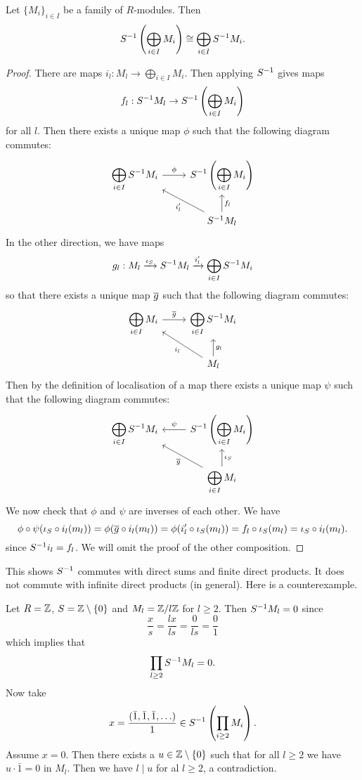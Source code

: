 \begin{prop}[2.8]
  Let $\{M_i\}_{i \in I}$ be a family of $R$-modules.
  Then
  \[S^{-1}\left( \bigoplus_{i \in I} M_i \right) \cong \bigoplus_{i \in I} S^{-1} M_i.\]
\end{prop}

\begin{proof}
  There are maps $i_l: M_l \to \bigoplus_{i \in I} M_i$.
  Then applying $S^{-1}$ gives maps
  \[f_l: S^{-1} M_l \to S^{-1} \left( \bigoplus_{i \in I} M_i \right)\]
  for all $l$.
  Then there exists a unique map $\phi$ such that the following diagram commutes:
  \[\begin{tikzcd}
    \ds \bigoplus_{i \in I} S\inv M_i \arrow[r, "\phi"] & \ds S\inv \left( \bigoplus_{i \in I} M_i \right) \\
     & S\inv M_l \arrow[lu, "i_l'"] \arrow[u, "f_l"']
  \end{tikzcd}\]
  In the other direction, we have maps
  \[g_l: M_l \xrightarrow{\iota_S} S^{-1} M_l \xrightarrow{i_l'} \bigoplus_{i \in I} S^{-1} M_i\]
  so that there exists a unique map $\overline g$ such that the following diagram commutes:
  \[\begin{tikzcd}
      \ds \bigoplus_{i \in I} M_i \ar[r, "\ol g"] & \ds \bigoplus_{i \in I} S\inv M_i \\
      & M_l \ar[ul, "i_l"] \ar[u, "g_l"']
  \end{tikzcd}\]
  Then by the definition of localisation of a map there exists a unique map $\psi$ such that the following diagram commutes:
  \[\begin{tikzcd}
    \ds \bigoplus_{i \in I} S\inv M_i & \ds S\inv \left( \bigoplus_{i \in I} M_i \right) \arrow[l, "\psi"'] \\
     & \ds \bigoplus_{i \in I} M_i \arrow[lu, "\ol g"] \arrow[u, "\iota_S"']
  \end{tikzcd}\]
  We now check that $\phi$ and $\psi$ are inverses of each other.
  We have
  \[\phi\circ\psi(\iota_S\circ i_l(m_l)) = \phi(\overline g \circ i_l(m_l)) = \phi(i_l' \circ \iota_S(m_l)) = f_l \circ \iota_S(m_l) = \iota_S \circ i_l(m_l).\]
  since $S^{-1} i_l = f_l$.
  We will omit the proof of the other composition.
\end{proof}

\begin{rmk}
  This shows $S^{-1}$ commutes with direct sums and finite direct products.
  It does not commute with infinite direct products (in general).
  Here is a counterexample.

  Let $R=\mathbb{Z}$, $S=\mathbb{Z} \setminus \{0\}$ and $M_l = \mathbb{Z}/l\mathbb{Z}$ for $l \geq 2$.
  Then $S^{-1} M_l=0$ since
  \[\frac{x}{s} = \frac{lx}{ls} = \frac{0}{ls} = \frac{0}{1}\]
  which implies that
  \[\prod_{l \geq 2} S^{-1} M_l = 0.\]
  Now take
  \[x=\frac{(\bar 1, \bar 1, \bar 1, \ldots)}{1} \in S^{-1} \left( \prod_{i \geq 2} M_i \right).\]
  Assume $x = 0$.
  Then there exists a $u \in \mathbb{Z} \setminus \{0\}$ such that for all $l \geq 2$ we have $u \cdot \bar 1 = 0$ in $M_l$.
  Then we have $l \mid u$ for al $l \geq 2$, a contradiction.
\end{rmk}

